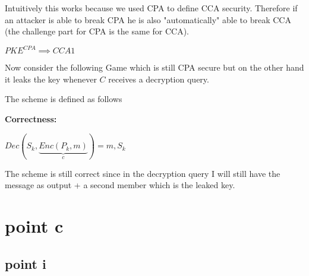 \noindent Intuitively this works because we used CPA to define CCA security. Therefore if an attacker is able to break CPA he is also "automatically" able to break CCA (the challenge part for CPA is the same for CCA).

\newpage
\bigskip
$PKE^{CPA} \implies CCA1$

Now consider the following Game which is still CPA secure but on the other hand it leaks the key whenever $C$ receives a decryption query.

The scheme is defined as follows
\begin{figure}[h!]
    \centering
    \sdinit{}
\end{figure}

\textbf{Correctness:}

$Dec(S_k,\underbrace{Enc(P_k,m)}_{c})=m,S_k$

The scheme is still correct since in the decryption query I will still have the message as output + a second member which is the leaked key. 

\newpage
\section{point c}
\subsection{point i}

